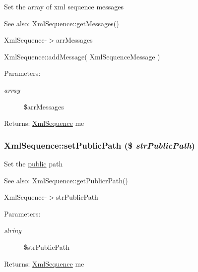 Set the array of xml sequence messages

\begin{Desc}
\item[See also:]\hyperlink{class_xml_sequence_21cc38a9b7b19954bb0b8951b065ad11}{XmlSequence::getMessages()} 

XmlSequence-$>$arrMessages 

XmlSequence::addMessage( XmlSequenceMessage ) \end{Desc}
\begin{Desc}
\item[Parameters:]
\begin{description}
\item[{\em array}]\$arrMessages \end{description}
\end{Desc}
\begin{Desc}
\item[Returns:]\hyperlink{class_xml_sequence}{XmlSequence} me \end{Desc}
\hypertarget{class_xml_sequence_1b463d4b176c4798b8be4667262f0450}{
\subsubsection[{setPublicPath}]{\setlength{\rightskip}{0pt plus 5cm}XmlSequence::setPublicPath (\$ {\em strPublicPath})}}
\label{class_xml_sequence_1b463d4b176c4798b8be4667262f0450}


Set the \hyperlink{namespacepublic}{public} path

\begin{Desc}
\item[See also:]XmlSequence::getPublicrPath() 

XmlSequence-$>$strPublicPath \end{Desc}
\begin{Desc}
\item[Parameters:]
\begin{description}
\item[{\em string}]\$strPublicPath \end{description}
\end{Desc}
\begin{Desc}
\item[Returns:]\hyperlink{class_xml_sequence}{XmlSequence} me \end{Desc}


